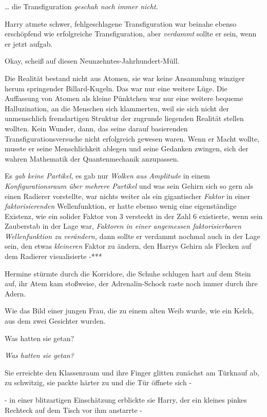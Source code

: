 {… die Transfiguration \emph{geschah noch immer nicht.}

Harry atmete schwer, fehlgeschlagene Transfiguration war beinahe ebenso erschöpfend wie erfolgreiche Transfiguration, aber \emph{verdammt} sollte er sein, wenn er jetzt aufgab.

Okay, scheiß auf diesen Neunzehntes-Jahrhundert-Müll.

Die Realität bestand nicht aus Atomen, sie war keine Ansammlung winziger herum springender Billard-Kugeln. Das war nur eine weitere Lüge. Die Auffassung von Atomen als kleine Pünktchen war nur eine weitere bequeme Halluzination, an die Menschen sich klammerten, weil sie sich nicht der unmenschlich fremdartigen Struktur der zugrunde liegenden Realität stellen wollten. Kein Wunder, dann, das seine darauf basierenden Transfigurationsversuche nicht erfolgreich gewesen waren. Wenn er Macht wollte, musste er seine Menschlichkeit ablegen und seine Gedanken zwingen, sich der wahren Mathematik der Quantenmechanik anzupassen.

Es \emph{gab keine Partikel,} es gab nur \emph{Wolken aus Amplitude} in einem \emph{Konfigurationsraum über mehrere Partikel} und was sein Gehirn sich so gern als einen Radierer vorstellte, war nichts weiter als ein gigantischer \emph{Faktor} in einer \emph{faktorisierenden} Wellenfunktion, er hatte ebenso wenig eine eigenständige Existenz, wie ein solider Faktor von 3 versteckt in der Zahl 6 existierte, wenn sein Zauberstab in der Lage war, \emph{Faktoren in einer angemessen faktorisierbaren Wellenfunktion zu verändern,} dann sollte er verdammt nochmal auch in der Lage sein, den etwas \emph{kleineren} Faktor zu ändern, den Harrys Gehirn als Flecken auf dem Radierer visualisierte -***

\later

Hermine stürmte durch die Korridore, die Schuhe schlugen hart auf dem Stein auf, ihr Atem kam stoßweise, der Adrenalin-Schock raste noch immer durch ihre Adern.

Wie das Bild einer jungen Frau, die zu einem alten Weib wurde, wie ein Kelch, aus dem zwei Gesichter wurden.

Was hatten sie getan?

\emph{Was hatten sie getan?}

Sie erreichte den Klassenraum und ihre Finger glitten zunächst am Türknauf ab, zu schwitzig, sie packte härter zu und die Tür öffnete sich -

- in einer blitzartigen Einschätzung erblickte sie Harry, der ein kleines pinkes Rechteck auf dem Tisch vor ihm anstarrte -

}
